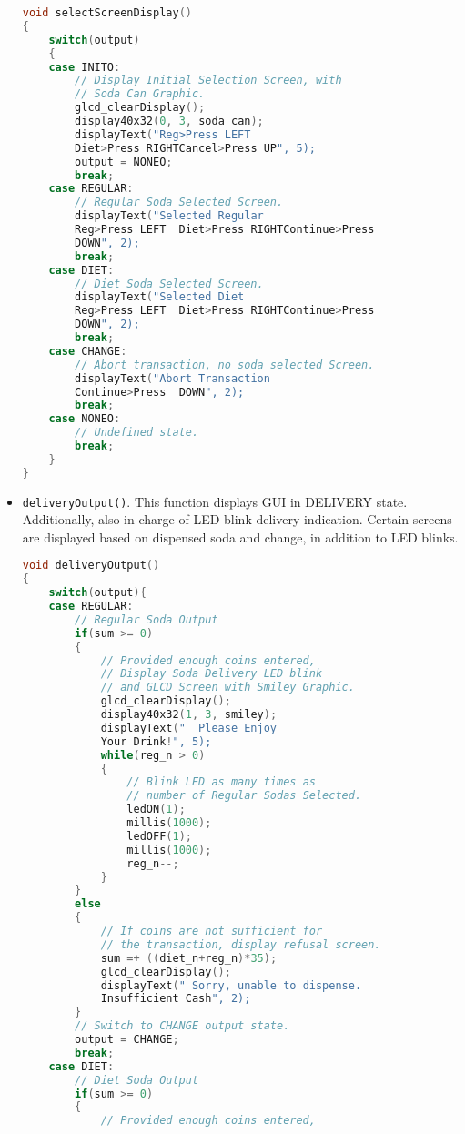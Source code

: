 \documentclass{article}
\begin{document}
\begin{itemize}
\begin{lstlisting}[basicstyle = \small, language = C]
void selectScreenDisplay()
{
    switch(output)
    {
    case INITO:
        // Display Initial Selection Screen, with 
        // Soda Can Graphic.
        glcd_clearDisplay();
        display40x32(0, 3, soda_can);
        displayText("Reg>Press LEFT  
        Diet>Press RIGHTCancel>Press UP", 5);
        output = NONEO;
        break;
    case REGULAR:
        // Regular Soda Selected Screen.
        displayText("Selected Regular                
        Reg>Press LEFT  Diet>Press RIGHTContinue>Press
        DOWN", 2);
        break;
    case DIET:
        // Diet Soda Selected Screen.
        displayText("Selected Diet                   
        Reg>Press LEFT  Diet>Press RIGHTContinue>Press
        DOWN", 2);
        break;
    case CHANGE:
        // Abort transaction, no soda selected Screen.
        displayText("Abort Transaction                
        Continue>Press  DOWN", 2);
        break;
    case NONEO:
        // Undefined state.
        break;
    }
}
  \end{lstlisting}
  \item \texttt{deliveryOutput()}. This function displays GUI in DELIVERY state. Additionally, also in charge of LED blink delivery indication. Certain screens are displayed based on dispensed soda and change, in addition to LED blinks.
      \begin{lstlisting}[basicstyle = \small, language = C]
void deliveryOutput()
{
    switch(output){
    case REGULAR:
        // Regular Soda Output
        if(sum >= 0)
        {
            // Provided enough coins entered, 
            // Display Soda Delivery LED blink 
            // and GLCD Screen with Smiley Graphic.
            glcd_clearDisplay();
            display40x32(1, 3, smiley);
            displayText("  Please Enjoy     
            Your Drink!", 5);
            while(reg_n > 0)
            {
                // Blink LED as many times as 
                // number of Regular Sodas Selected.
                ledON(1);
                millis(1000);
                ledOFF(1);
                millis(1000);
                reg_n--;
            }
        }
        else
        {
            // If coins are not sufficient for 
            // the transaction, display refusal screen.
            sum =+ ((diet_n+reg_n)*35);
            glcd_clearDisplay();
            displayText(" Sorry, unable to dispense.
            Insufficient Cash", 2);
        }
        // Switch to CHANGE output state.
        output = CHANGE;
        break;
    case DIET:
        // Diet Soda Output
        if(sum >= 0)
        {
            // Provided enough coins entered, 

\end{lstlisting}
\end{itemize}
\end{document}
